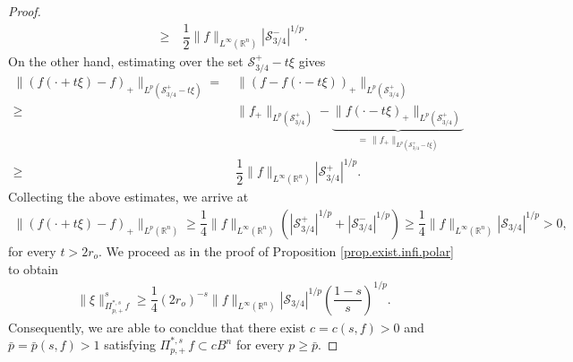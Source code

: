\documentclass[11pt, reqno]{article}
\theoremstyle{definition}
\numberwithin{equation}{section}
\newcommand{\R}{\mathbb{R}}
\newcommand{\Sset}{\mathscr S}
\begin{document}
\begin{proof}
\begin{align*}
	\geq & ~ \dfrac{1}{2} \| f \|_{L^\infty(\R^n)}|\Sset^-_{3/4}|^{1/p}.
\end{align*} 
On the other hand, estimating over the set $\Sset^+_{3/4} - t\xi$ gives
\begin{align*}
	\| (f(\cdot + t\xi) - f )_+ \|_{L^p(\Sset_{3/4}^+ - t\xi)} = & ~ \| (f - f(\cdot - t\xi))_+ \|_{L^p(\Sset_{3/4}^+)} \\
	\geq & ~ 
	\|	f_+ \|_{L^p(\Sset_{3/4}^+)} - \underbrace{\| f(\cdot - t \xi)_+ \|_{L^p(\Sset_{3/4}^+)} }_{ \, = \,  \| f_+ \|_{L^p(\Sset_{3/4}^+ - t \xi)}} 
	\\ 
	\geq & ~ \dfrac{1}{2} \| f \|_{L^\infty(\R^n)} |\Sset^+_{3/4}|^{1/p}.
\end{align*}
Collecting the above estimates, we arrive at
\begin{align*}
	\| (f(\cdot + t\xi) - f)_+ \|_{L^p(\R^n)} \geq \dfrac{1}{4} \| f \|_{L^\infty(\R^n)} (|\Sset^+_{3/4}|^{1/p} + |\Sset^-_{3/4}|^{1/p}) \geq \dfrac{1}{4} \| f \|_{L^\infty(\R^n)} |\Sset_{3/4}|^{1/p} > 0,
\end{align*}
for every $t > 2r_o$.
We proceed as in the proof of Proposition \ref{prop.exist.infi.polar} to obtain
\begin{align*}
	\| \xi \|^s_{\Pi^{\ast, s}_{p, +} \, f} \geq \dfrac{1}{4} (2r_o)^{-s}\| f \|_{L^\infty(\R^n)} |\Sset_{3/4}|^{1/p} \left( \dfrac{1 - s}{s} \right)^{1/p}.
\end{align*}
Consequently, we are able to concldue that there exist $c = c(s, f) > 0$ and $\bar p = \bar p(s, f) > 1$ satisfying $\Pi^{\ast, s}_{p, +} \, f \subset c B^n$ for every $p \geq \bar p$.

\medskip


\end{proof}
\end{document}
